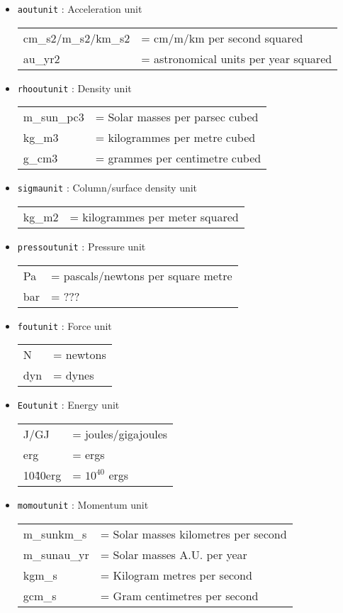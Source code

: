\documentclass[a4paper]{article}
\newcommand{\var}[1]{\texttt{#1}}
\begin{document}
\begin{itemize}
\item \var{aoutunit} : Acceleration unit \\
\begin{tabular}{ll}
cm\_s2/m\_s2/km\_s2 & = cm/m/km per second squared \\
au\_yr2             & = astronomical units per year squared
\end{tabular}

\item \var{rhooutunit} : Density unit \\
\begin{tabular}{ll}
m\_sun\_pc3 & = Solar masses per parsec cubed \\
kg\_m3      & = kilogrammes per metre cubed \\
g\_cm3      & = grammes per centimetre cubed
\end{tabular}

\item \var{sigmaunit} : Column/surface density unit \\
\begin{tabular}{ll}
kg\_m2      & = kilogrammes per meter squared
\end{tabular}

\item \var{pressoutunit} : Pressure unit \\
\begin{tabular}{ll}
Pa    & = pascals/newtons per square metre \\
bar   & = ???
\end{tabular}

\item \var{foutunit} : Force unit \\
\begin{tabular}{ll}
N    & = newtons \\
dyn  & = dynes
\end{tabular}

\item \var{Eoutunit} : Energy unit \\
\begin{tabular}{ll}
J/GJ      & = joules/gigajoules \\
erg       & = ergs \\
10\^40erg & = $10^{40}$ ergs
\end{tabular}

\item \var{momoutunit} : Momentum unit \\
\begin{tabular}{ll}
m\_sunkm\_s  & = Solar masses kilometres per second \\
m\_sunau\_yr & = Solar masses A.U. per year \\
kgm\_s       & = Kilogram metres per second \\
gcm\_s       & = Gram centimetres per second
\end{tabular}


\end{itemize}
\end{document}
